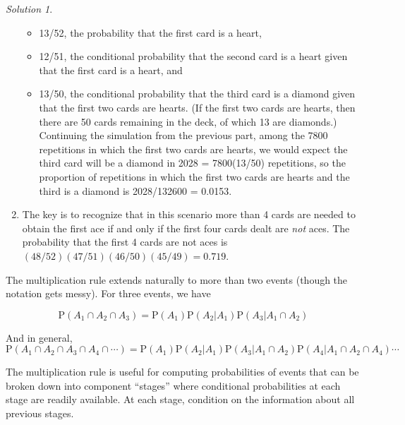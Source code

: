 \documentclass[
  letterpaper,
  DIV=11,
  numbers=noendperiod]{scrreprt}
\providecommand{\tightlist}{%
  \setlength{\itemsep}{0pt}\setlength{\parskip}{0pt}}
\theoremstyle{plain}
\theoremstyle{definition}
\theoremstyle{definition}
\theoremstyle{definition}
\theoremstyle{remark}
\newtheorem{refsolution}{Solution}[chapter]
\begin{document}
\begin{tcolorbox}
\begin{refsolution}
\begin{enumerate}
  \begin{itemize}
  \tightlist
  \item
    13/52, the probability that the first card is a heart,
  \item
    12/51, the conditional probability that the second card is a heart
    given that the first card is a heart, and
  \item
    13/50, the conditional probability that the third card is a diamond
    given that the first two cards are hearts. (If the first two cards
    are hearts, then there are 50 cards remaining in the deck, of which
    13 are diamonds.) Continuing the simulation from the previous part,
    among the 7800 repetitions in which the first two cards are hearts,
    we would expect the third card will be a diamond in 2028 =
    7800(13/50) repetitions, so the proportion of repetitions in which
    the first two cards are hearts and the third is a diamond is
    2028/132600 = 0.0153.
  \end{itemize}
\item
  The key is to recognize that in this scenario more than 4 cards are
  needed to obtain the first ace if and only if the first four cards
  dealt are \emph{not} aces. The probability that the first 4 cards are
  not aces is \((48/52)(47/51)(46/50)(45/49) = 0.719\).
\end{enumerate}

\label{sol-card-multiplication-rule}

\end{refsolution}

\end{tcolorbox}

The multiplication rule extends naturally to more than two events
(though the notation gets messy). For three events, we have

\[
\textrm{P}(A_1 \cap A_2 \cap A_3) = \textrm{P}(A_1)\textrm{P}(A_2|A_1)\textrm{P}(A_3|A_1\cap A_2)
\]

And in general, \[
\textrm{P}(A_1\cap A_2 \cap A_3 \cap A_4 \cap \cdots) = \textrm{P}(A_1)\textrm{P}(A_2|A_1)\textrm{P}(A_3|A_1\cap A_2)\textrm{P}(A_4|A_1\cap A_2 \cap A_4)\cdots
\]

The multiplication rule is useful for computing probabilities of events
that can be broken down into component ``stages'' where conditional
probabilities at each stage are readily available. At each stage,
condition on the information about all previous stages.
\end{document}
